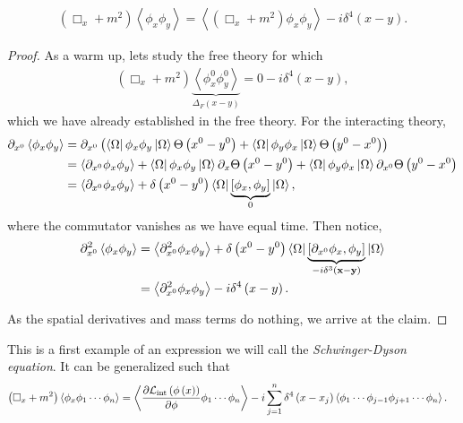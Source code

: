 \begin{claim}
    \begin{align}
        \left( \Box_x + m^2 \right) \left<\phi_x \phi_y \right> = \left< \left( \Box_x + m^2 \right) \phi_x \phi_y \right> - i \delta^{4} \left(  x- y \right) 
    .\end{align}
\end{claim}

\begin{proof}
    As a warm up, lets study the free theory for which
    \begin{align}
        \left( \Box_x + m^2 \right) \underbrace{\left<\phi_x^{0} \phi_y^{0} \right>}_{\Delta_F \left( x- y \right) } = 0 - i \delta^{4}\left( x-y \right) 
    ,\end{align}
    which we have already established in the free theory. For the interacting theory,
    \begin{align}
        \partial_{x^0} \left< \phi_x \phi_y \right> &= \partial_{x^0} \left( \bra{\Omega} \phi_x \phi_y \ket{\Omega} \Theta \left( x^{0} - y^{0} \right) + \bra{\Omega} \phi_y \phi_x \ket{\Omega} \Theta \left( y^{0} - x^{0} \right)  \right)  \\
        &= \left<\partial_{x^{0}} \phi_x \phi_y \right> + \bra{\Omega} \phi_x \phi_y \ket{\Omega} \partial_x \Theta \left( x^{0} - y^{0} \right)  + \bra{\Omega} \phi_y \phi_x \ket{\Omega} \partial_{x^{0}} \Theta \left( y^{0} - x^{0} \right)  \\
        &= \left< \partial_{x^{0}} \phi_x \phi_y \right> + \delta \left( x^{0} - y^{0} \right) \bra{\Omega} \underbrace{\left[ \phi_x, \phi_y \right]}_{0} \ket{\Omega}
    ,\end{align}
    where the commutator vanishes as we have equal time.
    Then notice,
    \begin{align}
        \partial_{x^{0}}^2 \left<\phi_x \phi_y \right> &= \left<\partial_{x^{0}}^2 \phi_x \phi_y \right> + \delta \left( x^{0} - y^{0} \right) \bra{\Omega} \underbrace{\left[ \partial_{x^{0}} \phi_x , \phi_y \right]}_{-i \delta^{3}\left( \vb{x} - \vb{y} \right) } \ket{\Omega} \\
        &= \left<\partial_{x^{0}}^2 \phi_x \phi_y \right> - i \delta^{4} \left( x -y \right) 
    .\end{align}

    As the spatial derivatives and mass terms do nothing, we arrive at the claim.
\end{proof}

This is a first example of an expression we will call the \textit{Schwinger-Dyson equation}. It can be generalized such that
\begin{align} \label{eq:schwinger_dyson}
    \left( \Box_x + m^2 \right) \left<\phi_x \phi_1 \cdots \phi_n \right> &= \left< \pdv{\mathcal{L}_{\text{int}}\left( \phi \left( x \right) \right)}{\phi}   \phi_1 \cdots \phi_n \right> - i \sum_{j=1}^{n}  \delta^{4} \left( x - x_j \right) \left<\phi_1 \cdots \phi_{j-1} \phi_{j+1} \cdots \phi_n \right>
.\end{align}

